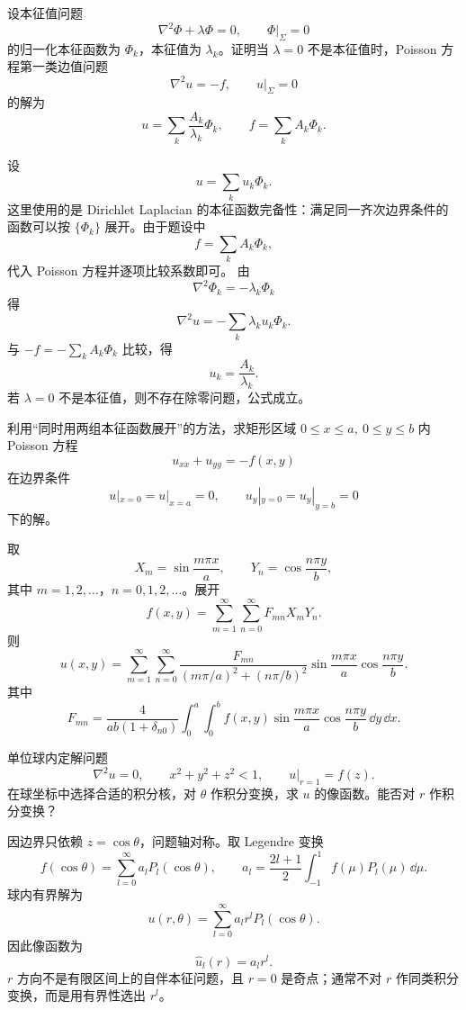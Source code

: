 ﻿


\begin{question}
设本征值问题
\[
\nabla^2\Phi+\lambda\Phi=0,\qquad \Phi|_\Sigma=0
\]
的归一化本征函数为 \(\Phi_k\)，本征值为 \(\lambda_k\)。证明当 \(\lambda=0\) 不是本征值时，Poisson 方程第一类边值问题
\[
\nabla^2u=-f,\qquad u|_\Sigma=0
\]
的解为
\[
u=\sum_k\frac{A_k}{\lambda_k}\Phi_k,\qquad
f=\sum_kA_k\Phi_k.
\]
\begin{solution}
设
\[
u=\sum_ku_k\Phi_k.
\]
这里使用的是 Dirichlet Laplacian 的本征函数完备性：满足同一齐次边界条件的函数可以按 \(\{\Phi_k\}\) 展开。由于题设中
\[
f=\sum_kA_k\Phi_k,
\]
代入 Poisson 方程并逐项比较系数即可。
由
\[
\nabla^2\Phi_k=-\lambda_k\Phi_k
\]
得
\[
\nabla^2u=-\sum_k\lambda_ku_k\Phi_k.
\]
与 \(-f=-\sum_kA_k\Phi_k\) 比较，得
\[
u_k=\frac{A_k}{\lambda_k}.
\]
若 \(\lambda=0\) 不是本征值，则不存在除零问题，公式成立。
\end{solution}
\end{question}

\begin{question}
利用“同时用两组本征函数展开”的方法，求矩形区域 \(0\le x\le a,\ 0\le y\le b\) 内 Poisson 方程
\[
u_{xx}+u_{yy}=-f(x,y)
\]
在边界条件
\[
u|_{x=0}=u|_{x=a}=0,\qquad
u_y|_{y=0}=u_y|_{y=b}=0
\]
下的解。
\begin{solution}
取
\[
X_m=\sin\frac{m\pi x}{a},\qquad
Y_n=\cos\frac{n\pi y}{b},
\]
其中 \(m=1,2,\ldots\)，\(n=0,1,2,\ldots\)。展开
\[
f(x,y)=\sum_{m=1}^{\infty}\sum_{n=0}^{\infty}F_{mn}X_mY_n.
\]
则
\[
u(x,y)=\sum_{m=1}^{\infty}\sum_{n=0}^{\infty}
\frac{F_{mn}}{(m\pi/a)^2+(n\pi/b)^2}
\sin\frac{m\pi x}{a}\cos\frac{n\pi y}{b}.
\]
其中
\[
F_{mn}=\frac{4}{ab(1+\delta_{n0})}
\int_0^a\int_0^b f(x,y)
\sin\frac{m\pi x}{a}\cos\frac{n\pi y}{b}\,\dd{y}\,\dd{x}.
\]
\end{solution}
\end{question}

\begin{question}
单位球内定解问题
\[
\nabla^2u=0,\qquad x^2+y^2+z^2<1,\qquad
u|_{r=1}=f(z).
\]
在球坐标中选择合适的积分核，对 \(\theta\) 作积分变换，求 \(u\) 的像函数。能否对 \(r\) 作积分变换？
\begin{solution}
因边界只依赖 \(z=\cos\theta\)，问题轴对称。取 Legendre 变换
\[
f(\cos\theta)=\sum_{l=0}^{\infty}a_lP_l(\cos\theta),
\qquad
a_l=\frac{2l+1}{2}\int_{-1}^{1}f(\mu)P_l(\mu)\,\dd{\mu}.
\]
球内有界解为
\[
u(r,\theta)=\sum_{l=0}^{\infty}a_lr^lP_l(\cos\theta).
\]
因此像函数为
\[
\hat u_l(r)=a_lr^l.
\]
\(r\) 方向不是有限区间上的自伴本征问题，且 \(r=0\) 是奇点；通常不对 \(r\) 作同类积分变换，而是用有界性选出 \(r^l\)。
\end{solution}
\end{question}

